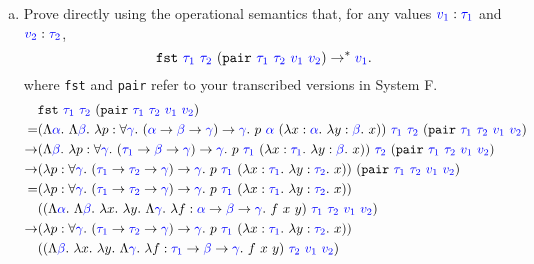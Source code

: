 \documentclass{article}
\theoremstyle{definition}
\newcommand{\meta}[1]{{\color{blue}#1}}
\begin{document}
\begin{enumerate}[start=1,label={{\bf Problem \arabic*}.},ref=\arabic*,left=0pt..0pt,widest*=10,align=left,itemindent=*]
\begin{enumerate}[(a),left=1em]
  \item Prove directly using the operational semantics that, for any values
    $\meta{v_1}:\meta{\tau_1}$ and $\meta{v_2}:\meta{\tau_2}$,
    \[
      \mathtt{fst}\ \meta{\tau_1}\ \meta{\tau_2}\ (\mathtt{pair}\ \meta{\tau_1}\ \meta{\tau_2}\ \meta{v_1}\ \meta{v_2}) \to^* \meta{v_1}.
    \]
    where \texttt{fst} and \texttt{pair} refer to your transcribed versions in System F.
    \begin{align*}
      & \mathtt{fst}\ \meta{\tau_1}\ \meta{\tau_2}\ (\mathtt{pair}\ \meta{\tau_1}\ \meta{\tau_2}\ \meta{v_1}\ \meta{v_2}) \\
      = & (\Lambda \meta{\alpha}.\ \Lambda \meta{\beta}.\ \lambda p : \forall \meta{\gamma}.\ (\meta{\alpha}\to\meta{\beta}\to\meta{\gamma}) \to \meta{\gamma}.\ p\ \meta{\alpha}\ (\lambda x : \meta{\alpha}.\ \lambda y : \meta{\beta}.\ x)) \ \meta{\tau_1}\ \meta{\tau_2}\ (\mathtt{pair}\ \meta{\tau_1}\ \meta{\tau_2}\ \meta{v_1}\ \meta{v_2}) \\
      \to & (\Lambda \meta{\beta}.\ \lambda p : \forall \meta{\gamma}.\ (\meta{\tau_1}\to\meta{\beta}\to\meta{\gamma}) \to \meta{\gamma}.\ p\ \meta{\tau_1}\ (\lambda x : \meta{\tau_1}.\ \lambda y : \meta{\beta}.\ x)) \ \meta{\tau_2}\ (\mathtt{pair}\ \meta{\tau_1}\ \meta{\tau_2}\ \meta{v_1}\ \meta{v_2}) \\
      \to & (\lambda p : \forall \meta{\gamma}.\ (\meta{\tau_1}\to\meta{\tau_2}\to\meta{\gamma}) \to \meta{\gamma}.\ p\ \meta{\tau_1}\ (\lambda x : \meta{\tau_1}.\ \lambda y : \meta{\tau_2}.\ x)) \ (\mathtt{pair}\ \meta{\tau_1}\ \meta{\tau_2}\ \meta{v_1}\ \meta{v_2}) \\
      = & (\lambda p : \forall \meta{\gamma}.\ (\meta{\tau_1}\to\meta{\tau_2}\to\meta{\gamma}) \to \meta{\gamma}.\ p\ \meta{\tau_1}\ (\lambda x : \meta{\tau_1}.\ \lambda y : \meta{\tau_2}.\ x)) \\ & ((\Lambda \meta{\alpha}.\ \Lambda \meta{\beta}.\ \lambda x.\ \lambda y.\ \Lambda \meta{\gamma}.\ \lambda f : \meta{\alpha} \to \meta{\beta} \to \meta{\gamma}.\ f \ x\ y)\ \meta{\tau_1}\ \meta{\tau_2}\ \meta{v_1}\ \meta{v_2}) \\
      \to & (\lambda p : \forall \meta{\gamma}.\ (\meta{\tau_1}\to\meta{\tau_2}\to\meta{\gamma}) \to \meta{\gamma}.\ p\ \meta{\tau_1}\ (\lambda x : \meta{\tau_1}.\ \lambda y : \meta{\tau_2}.\ x)) \\ & ((\Lambda \meta{\beta}.\ \lambda x.\ \lambda y.\ \Lambda \meta{\gamma}.\ \lambda f : \meta{\tau_1} \to \meta{\beta} \to \meta{\gamma}.\ f\ x\ y)\ \meta{\tau_2}\ \meta{v_1}\ \meta{v_2}) \\

\end{align*}
\end{enumerate}
\end{enumerate}
\end{document}

